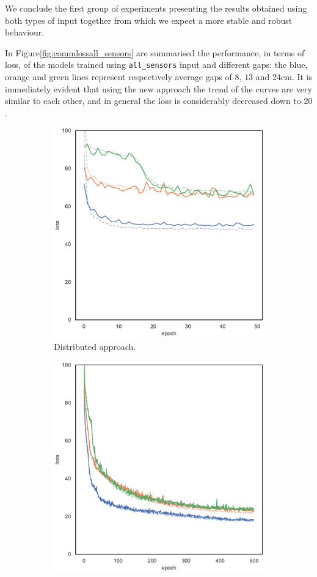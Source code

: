 We conclude the first group of experiments presenting the results obtained using 
both types of input together from which we expect a more stable and robust 
behaviour.

In Figure\ref{fig:commlossall_sensors} are summarised the performance, 
in terms of loss, of the models trained using \texttt{all\_sensors} input and 
different gaps: the blue, orange and green lines represent respectively average 
gaps of $8$, $13$ and $24$\gls{cm}.
It is immediately evident that using the new approach the trend of the curves are 
very similar to each other, and in general the loss is considerably decreased down 
to $20$.
\begin{figure}[!htb]
	\begin{center}
			\begin{subfigure}[h]{0.49\textwidth}
			\centering
			\includegraphics[width=.7\textwidth]{contents/images/task1-comm/loss-distributed-all_sensors@copy}
			\caption{Distributed approach.}
		\end{subfigure}
		\hfill
		\begin{subfigure}[h]{0.49\textwidth}
			\centering
			\includegraphics[width=.7\textwidth]{contents/images/task1-comm/loss-communication-all_sensors@copy}

\end{subfigure}
\end{center}
\end{figure}
